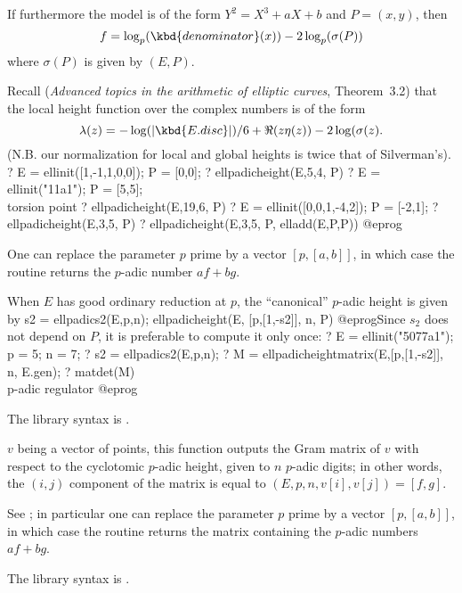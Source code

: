 If furthermore the model is of the form $Y^2 = X^3 + a X + b$ and $P = (x,y)$,
then
  $$ f = \log_p(\kbd{denominator}(x)) - 2 \log_p(\sigma(P))$$
where $\sigma(P)$ is given by $(E,P)$.

Recall (\emph{Advanced topics in the arithmetic of elliptic
curves}, Theorem~3.2) that the local height function over the complex numbers
is of the form
  $$ \lambda(z) = -\log (|\kbd{E.disc}|) / 6 + \Re(z \eta(z)) - 2 \log(
  \sigma(z). $$
(N.B. our normalization for local and global heights is twice that of
Silverman's).
\bprog
 ? E = ellinit([1,-1,1,0,0]); P = [0,0];
 ? ellpadicheight(E,5,4, P)
 ? E = ellinit("11a1"); P = [5,5]; \\ torsion point
 ? ellpadicheight(E,19,6, P)
 ? E = ellinit([0,0,1,-4,2]); P = [-2,1];
 ? ellpadicheight(E,3,5, P)
 ? ellpadicheight(E,3,5, P, elladd(E,P,P))
@eprog

One can replace the parameter $p$ prime by a vector $[p,[a,b]]$, in which
case the routine returns the $p$-adic number $af + bg$.

When $E$ has good ordinary reduction at $p$, the ``canonical''
$p$-adic height is given by
\bprog
s2 = ellpadics2(E,p,n);
ellpadicheight(E, [p,[1,-s2]], n, P)
@eprog\noindent Since $s_2$ does not depend on $P$, it is preferable to
compute it only once:
\bprog
? E = ellinit("5077a1"); p = 5; n = 7;
? s2 = ellpadics2(E,p,n);
? M = ellpadicheightmatrix(E,[p,[1,-s2]], n, E.gen);
? matdet(M)   \\ p-adic regulator
@eprog

The library syntax is .

\label{se:ellpadicheightmatrix}
$v$ being a vector of points, this function outputs the Gram matrix of
$v$ with respect to the cyclotomic $p$-adic height, given to $n$ $p$-adic
digits; in other words, the $(i,j)$ component of the matrix is equal to
$(E,p,n, v[i],v[j]) = [f,g]$.

See ; in particular one can replace the parameter $p$
prime by a vector $[p,[a,b]]$, in which case the routine returns the matrix
containing the $p$-adic numbers $af + bg$.

The library syntax is .


